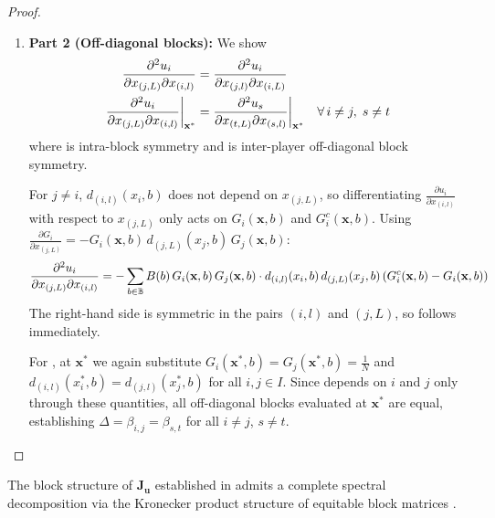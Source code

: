 \documentclass{article}
\begin{document}
\begin{proof}
\begin{enumerate}
                    \item[] \textbf{Part 2 (Off-diagonal blocks):} We show
                    \begin{align}
                        \pdv[2]{u_i}{x_{(j,L)}}{x_{(i,l)}} &= 
                        \pdv[2]{u_i}{x_{(j,l)}}{x_{(i,L)}} 
                        \label{eq:Jacobian_inter_player_sym} \\
                        \pdv[2]{u_i}{x_{(j,L)}}{x_{(i,l)}}\bigg|_{\mathbf{x}^*} &= 
                        \pdv[2]{u_s}{x_{(t,L)}}{x_{(s,l)}}\bigg|_{\mathbf{x}^*} \quad 
                        \forall\, i \neq j,\; s \neq t
                        \label{eq:Jacobian_inter_off_sym}
                    \end{align}
                    where  is intra-block symmetry and 
                     is inter-player off-diagonal block 
                    symmetry.

                    For $j \neq i$, $d_{(i,l)}(x_i,b)$ does not depend on $x_{(j,L)}$, 
                    so differentiating $\frac{\partial u_i}{\partial x_{(i,l)}}$ with 
                    respect to $x_{(j,L)}$ only acts on $G_i(\mathbf{x},b)$ and 
                    $G_i^c(\mathbf{x},b)$. Using $\frac{\partial G_i}{\partial x_{(j,L)}} 
                    = -G_i(\mathbf{x},b)\, d_{(j,L)}(x_j,b)\, G_j(\mathbf{x},b)$:
                    \begin{align}
                        \pdv[2]{u_i}{x_{(j,L)}}{x_{(i,l)}} = -\sum_{b \in \mathbb{B}} 
                        B(b)\, G_i(\mathbf{x},b)\, G_j(\mathbf{x},b) \cdot 
                        d_{(i,l)}(x_i,b)\, d_{(j,L)}(x_j,b) 
                        \left(G_i^c(\mathbf{x},b) - G_i(\mathbf{x},b)\right)
                        \label{eq:SI_jacobians_B}
                    \end{align}
                    The right-hand side is symmetric in the pairs $(i,l)$ and $(j,L)$, 
                    so  follows immediately.

                    For , at $\mathbf{x}^*$ we again 
                    substitute $G_i(\mathbf{x}^*,b) = G_j(\mathbf{x}^*,b) = \frac{1}{N}$ 
                    and $d_{(i,l)}(x_i^*,b) = d_{(j,l)}(x_j^*,b)$ for all $i,j \in I$. 
                    Since  depends on $i$ and $j$ only through 
                    these quantities, all off-diagonal blocks evaluated at $\mathbf{x}^*$ 
                    are equal, establishing $\Delta = \beta_{i,j} = \beta_{s,t}$ for all 
                    $i \neq j$, $s \neq t$.
                \end{enumerate}
            \end{proof}
            The block structure of $\mathbf{J}_{\mathbf{u}}$ established in  admits a complete spectral decomposition via the Kronecker product structure of equitable block matrices \cite{silvester2000determinants}.
\end{document}
